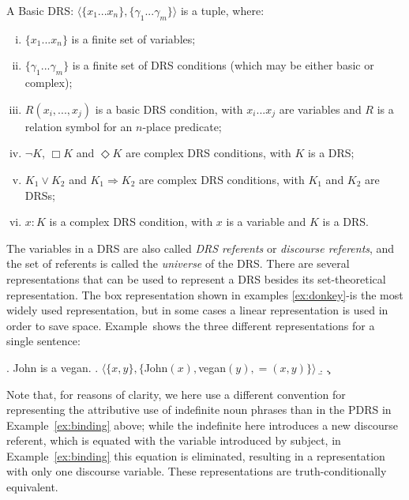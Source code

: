 \begin{definition} \label{def:bDRS}
A Basic DRS: $\langle \{x_1 ... x_n\},\{\gamma_1 ... \gamma_m\} \rangle$
is a tuple, where:
 \begin{enumerate}[i.]
  \item $\{x_1 ... x_n\}$ is a finite set of variables;
  \item $\{\gamma_1 ... \gamma_m\}$ is a finite set of DRS conditions (which
    may be either basic or complex);
  \item\label{def:bDRS:Rel} $R(x_i, ..., x_j)$ is a basic DRS condition,
    with $x_i ... x_j$ are variables and $R$ is a relation symbol for an
    $n$-place predicate;
  \item $\neg K$, $\Box K$ and $\Diamond K$ are complex DRS conditions, with
    $K$ is a DRS;
  \item $K_1 \vee K_2$ and $K_1 \Rightarrow K_2$ are complex DRS conditions,
    with $K_1$ and $K_2$ are DRSs;
  \item \label{def:bDRS:Prop} $x:K$ is a complex DRS condition, with $x$ is
    a variable and $K$ is a DRS.
 \end{enumerate} 
\end{definition}

\noindent The variables in a DRS are also called \textit{DRS referents} or
\textit{discourse referents}, and the set of referents is called the
\textit{universe} of the DRS.  There are several representations that can be
used to represent a DRS besides its set-theoretical representation. The box
representation shown in examples \ref{ex:donkey}-\Last is the most widely
used representation, but in some cases a linear representation is used in
order to save space. Example~\Next shows the three different
representations for a single sentence:

\ex. John is a vegan.
\a. $\langle \{x, y\},\{$John$(x),$vegan$(y), =(x,y)\}\rangle$
\b. 
\c. 

Note that, for reasons of clarity, we here use a different convention for
representing the attributive use of indefinite noun phrases than in the
PDRS in Example~\ref{ex:binding} above; while the indefinite here introduces
a new discourse referent, which is equated with the variable introduced by
subject, in Example~\ref{ex:binding} this equation is eliminated, resulting
in a representation with only one discourse variable.  These representations
are truth-conditionally equivalent.

